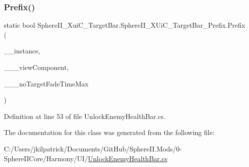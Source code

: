 \subsubsection{\texorpdfstring{Prefix()}{Prefix()}}
{\footnotesize\ttfamily static bool Sphere\+I\+I\+\_\+\+Xui\+C\+\_\+\+Target\+Bar.\+Sphere\+I\+I\+\_\+\+X\+Ui\+C\+\_\+\+Target\+Bar\+\_\+\+Prefix.\+Prefix (\begin{DoxyParamCaption}\item[{X\+Ui\+C\+\_\+\+Target\+Bar}]{\+\_\+\+\_\+instance,  }\item[{ref X\+Ui\+View}]{\+\_\+\+\_\+\+\_\+view\+Component,  }\item[{ref float}]{\+\_\+\+\_\+\+\_\+no\+Target\+Fade\+Time\+Max }\end{DoxyParamCaption})\hspace{0.3cm}{\ttfamily [static]}}



Definition at line 53 of file Unlock\+Enemy\+Health\+Bar.\+cs.



The documentation for this class was generated from the following file\+:\begin{DoxyCompactItemize}
\item 
C\+:/\+Users/jkilpatrick/\+Documents/\+Git\+Hub/\+Sphere\+I\+I.\+Mods/0-\/\+Sphere\+I\+I\+Core/\+Harmony/\+U\+I/\mbox{\hyperlink{_unlock_enemy_health_bar_8cs}{Unlock\+Enemy\+Health\+Bar.\+cs}}\end{DoxyCompactItemize}
